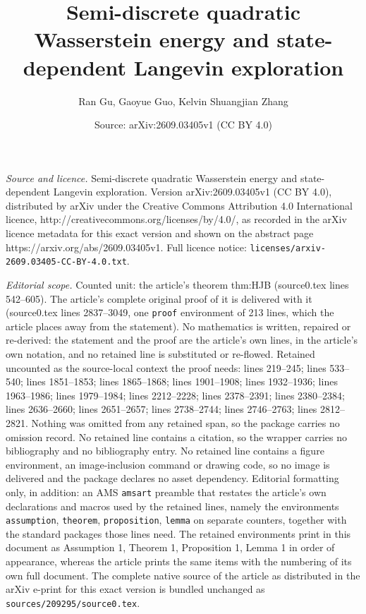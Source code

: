 \documentclass[10pt,a4paper]{amsart}
\title{Semi-discrete quadratic Wasserstein energy and state-dependent Langevin exploration}
\author{Ran Gu, Gaoyue Guo, Kelvin Shuangjian Zhang}
\date{Source: arXiv:2609.03405v1 (CC BY 4.0)}
\begin{document}
\maketitle

\noindent\emph{Source and licence.} Semi-discrete quadratic Wasserstein energy and state-dependent Langevin exploration. Version arXiv:2609.03405v1 (CC BY 4.0), distributed by arXiv under the Creative Commons Attribution 4.0 International licence, http://creativecommons.org/licenses/by/4.0/, as recorded in the arXiv licence metadata for this exact version and shown on the abstract page https://arxiv.org/abs/2609.03405v1. Full licence notice: \texttt{licenses/arxiv-2609.03405-CC-BY-4.0.txt}.\par\smallskip

\noindent\textit{Editorial scope.} Counted unit: the article's theorem thm:HJB (source0.tex lines 542--605). The article's complete original proof of it is delivered with it (source0.tex lines 2837--3049, one \texttt{proof} environment of 213 lines, which the article places away from the statement). No mathematics is written, repaired or re-derived: the statement and the proof are the article's own lines, in the article's own notation, and no retained line is substituted or re-flowed.  Retained uncounted as the source-local context the proof needs: lines 219--245; lines 533--540; lines 1851--1853; lines 1865--1868; lines 1901--1908; lines 1932--1936; lines 1963--1986; lines 1979--1984; lines 2212--2228; lines 2378--2391; lines 2380--2384; lines 2636--2660; lines 2651--2657; lines 2738--2744; lines 2746--2763; lines 2812--2821.  Nothing was omitted from any retained span, so the package carries no omission record.  No retained line contains a citation, so the wrapper carries no bibliography and no bibliography entry.  No retained line contains a figure environment, an image-inclusion command or drawing code, so no image is delivered and the package declares no asset dependency.  Editorial formatting only, in addition: an AMS \texttt{amsart} preamble that restates the article's own declarations and macros used by the retained lines, namely the environments \texttt{assumption}, \texttt{theorem}, \texttt{proposition}, \texttt{lemma} on separate counters, together with the standard packages those lines need.  The retained environments print in this document as Assumption 1, Theorem 1, Proposition 1, Lemma 1 in order of appearance, whereas the article prints the same items with the numbering of its own full document.  The complete native source of the article as distributed in the arXiv e-print for this exact version is bundled unchanged as \texttt{sources/209295/source0.tex}.
\end{document}
